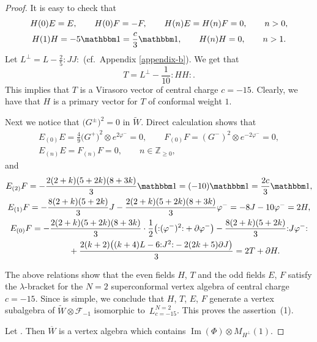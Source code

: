 \documentclass[11pt]{article}
\numberwithin{equation}{section}
\newcommand{\F}{\mathcal F}
\begin{document}
\begin{proof}


It is easy to check that
\begin{gather*}
 H(0) E = E, \qquad H(0) F =-F, \qquad H(n) E = H(n) F =0, \qquad n >0, \\
 H(1) H = - 5 {\mathbbm 1} = \frac{c}{3} {\mathbbm 1},\qquad H(n) H =0, \qquad n >1.
\end{gather*}
 Let $L^{\perp} = L- \frac{2}{5} {:}J J{:}$ (cf.\ Appendix \ref{appendix-b}). We get that
\[
 T = L^{\perp} -\frac{1}{10} {:}H H{:}.
 \]
This implies that $T$ is a Virasoro vector of central charge $c=-15$. Clearly, we have that $H$ is a primary vector for $T$ of conformal weight $1$.


 Next we notice that $\bigl(G^\pm \bigr)^2 =0$ in $\widetilde W$. Direct calculation shows that
 \begin{gather*}
 E_{(0)} E = \frac{4}{9} {\bigl( G^+ \bigr)}^2 \otimes e^{2 \varphi^-} =0, \qquad F_{(0)}F = {( G^-)}^2 \otimes e^{-2 \varphi^-} =0, \\
 E_{(n)} E = F_{(n)} F =0, \qquad n\in {\mathbb Z}_{\ge 0},
\end{gather*}
and
\begin{gather*}
	E_{(2)} F = -\frac{2 (2 + k)(5 + 2k)(8 + 3k)}{3} {\mathbbm 1} =(-10) {\mathbbm 1} = \frac{2 c}{3} {\mathbbm 1}, \\
E_{(1)} F = -\frac{ 8(2 + k)(5 + 2k)}{3} J - \frac{2 (2 + k)(5 + 2k)(8 + 3k)}{3} \varphi^- = -8 J - 10 \varphi^- = 2 H, \\
 E_{(0)} F = - \frac{2 (2 + k)(5 + 2k)(8 + 3k)}{3}\cdot\frac{1}{2}\bigl({:}( \varphi^-)^2{:}+\partial\varphi^-\bigr)-\frac{ 8(2 + k)(5 + 2k)}{3} {:}J \varphi^-{:} \\
 \phantom{E_{(0)} F =}{}+\frac{2(k+2) \bigl((k+4)L-6{:}J^2{:}-2(2k+5) \partial J\bigr)}{3} = 2T + \partial H.
\end{gather*}

The above relations show that the even fields $H$, $ T$ and the odd fields $E$, $F$ satisfy the $\lambda$-bracket for the $N=2$ superconformal vertex algebra of central charge $c=-15$. Since  is simple, we conclude that $H$, $T$, $E$, $F$ generate a vertex subalgebra of $\widetilde W \otimes \F_{-1}$ isomorphic to~$L^{N=2}_{c=-15}$. This proves the assertion~(1).

 Let . Then $\overline{W}$ is a vertex algebra which contains $ \operatorname{Im} (\Phi)\otimes M_{H^{\perp}} (1)$.




\end{proof}
\end{document}

